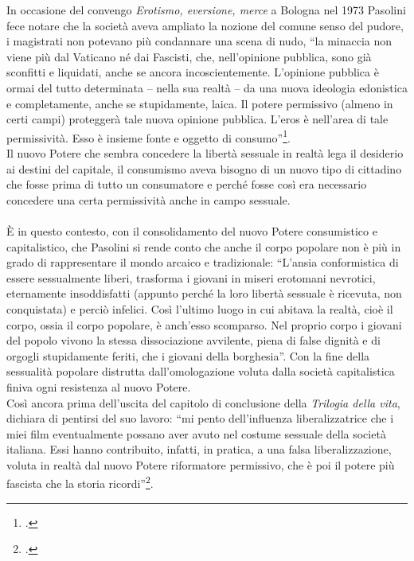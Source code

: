 In occasione del convengo \textit{Erotismo, eversione, merce} a Bologna nel 1973 Pasolini fece notare che la società aveva ampliato la nozione del comune senso del pudore, i magistrati non potevano più condannare una scena di nudo, \enquote{la minaccia non viene più dal Vaticano né dai Fascisti, che, nell'opinione pubblica, sono già sconfitti e liquidati, anche se ancora incoscientemente. L’opinione pubblica è ormai del tutto determinata – nella sua realtà – da una nuova ideologia edonistica e completamente, anche se stupidamente, laica. Il potere permissivo (almeno in certi campi) proteggerà tale nuova opinione pubblica. L’eros è nell'area di tale permissività. Esso è insieme fonte e oggetto di consumo}\footcite{Tetis}.
\\Il nuovo Potere che sembra concedere la libertà sessuale in realtà lega il desiderio ai destini del capitale, il consumismo aveva bisogno di un nuovo tipo di cittadino che fosse prima di tutto un consumatore e perché fosse così era necessario concedere una certa permissività anche in campo sessuale.

\paragraph{}È in questo contesto, con il consolidamento del nuovo Potere consumistico e capitalistico, che Pasolini si rende conto che anche il corpo popolare non è più in grado di rappresentare il mondo arcaico e tradizionale: \enquote{L’ansia conformistica di essere sessualmente liberi, trasforma i giovani in miseri erotomani nevrotici, eternamente insoddisfatti (appunto perché la loro libertà sessuale è ricevuta, non conquistata) e perciò infelici. Così l’ultimo luogo in cui abitava la realtà, cioè il corpo, ossia il corpo popolare, è anch’esso scomparso. Nel proprio corpo i giovani del popolo vivono la stessa dissociazione avvilente, piena di false dignità e di orgogli stupidamente feriti, che i giovani della borghesia}.
Con la fine della sessualità popolare distrutta dall'omologazione voluta dalla società capitalistica finiva ogni resistenza al nuovo Potere.
\\Così ancora prima dell'uscita del capitolo di conclusione della \textit{Trilogia della vita}, dichiara di pentirsi del suo lavoro: \enquote{mi pento dell'influenza liberalizzatrice che i miei film eventualmente possano aver avuto nel costume sessuale della società italiana. Essi hanno contribuito, infatti, in pratica, a una falsa liberalizzazione, voluta in realtà dal nuovo Potere riformatore permissivo, che è poi il potere più fascista che la storia ricordi}\footcite{Tetis}.

